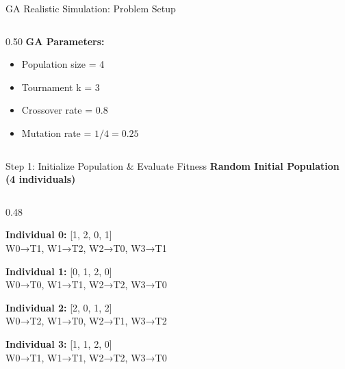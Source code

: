 \documentclass[aspectratio=169,10pt]{beamer}
\begin{document}
\begin{frame}{GA Realistic Simulation: Problem Setup}
\begin{columns}[T]
\begin{column}{0.50\textwidth}
      \vspace{0.3cm}
      \textbf{GA Parameters:}
      \begin{itemize}
        \item Population size = 4
        \item Tournament k = 3
        \item Crossover rate = 0.8
        \item Mutation rate = $1/4 = 0.25$
      \end{itemize}
    \end{column}
  \end{columns}
\end{frame}

\begin{frame}{Step 1: Initialize Population \& Evaluate Fitness}
  \colorbox{navymid}{\color{teallt}\bfseries Random Initial Population (4 individuals)}
  
  \vspace{0.4cm}
  \begin{columns}[T]
    \begin{column}{0.48\textwidth}
      \colorbox{offwhite}{\begin{minipage}{\linewidth}
        {\small\bfseries\color{navydark} Individual 0:} {\small [1, 2, 0, 1]}\\
        {\scriptsize\color{mygray} W0→T1, W1→T2, W2→T0, W3→T1}
      \end{minipage}}
      
      \vspace{0.2cm}
      \colorbox{offwhite}{\begin{minipage}{\linewidth}
        {\small\bfseries\color{navydark} Individual 1:} {\small [0, 1, 2, 0]}\\
        {\scriptsize\color{mygray} W0→T0, W1→T1, W2→T2, W3→T0}
      \end{minipage}}
      
      \vspace{0.2cm}
      \colorbox{offwhite}{\begin{minipage}{\linewidth}
        {\small\bfseries\color{navydark} Individual 2:} {\small [2, 0, 1, 2]}\\
        {\scriptsize\color{mygray} W0→T2, W1→T0, W2→T1, W3→T2}
      \end{minipage}}
      
      \vspace{0.2cm}
      \colorbox{offwhite}{\begin{minipage}{\linewidth}
        {\small\bfseries\color{navydark} Individual 3:} {\small [1, 1, 2, 0]}\\
        {\scriptsize\color{mygray} W0→T1, W1→T1, W2→T2, W3→T0}
      \end{minipage}}
    \end{column}
    

\end{columns}
\end{frame}
\end{document}

